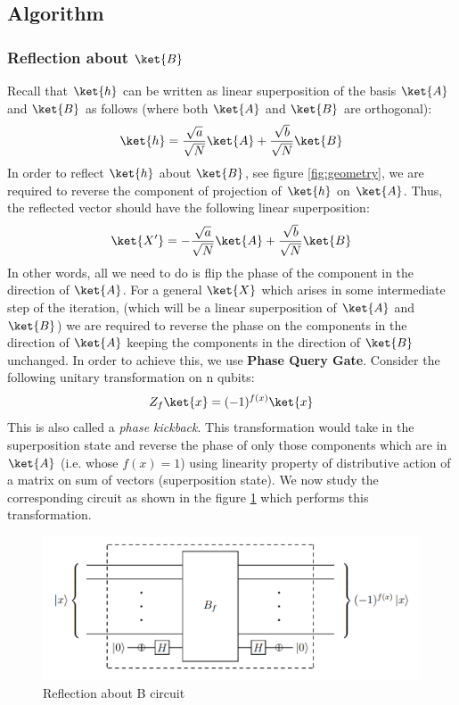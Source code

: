 \documentclass[12pt, oneside]{book}
\theoremstyle{definition}
\theoremstyle{definition}
\theoremstyle{remark}
\begin{document}
\subsection{Algorithm}
\subsubsection{Reflection about $\ket{B}$} 
Recall that $\ket{h}$ can be written as linear superposition of the basis $\ket{A}$ and $\ket{B}$ as follows (where both $\ket{A}$ and $\ket{B}$ are orthogonal):
\[
\ket{h}=\frac{\sqrt{a}}{\sqrt{N}}\ket{A}+\frac{\sqrt{b}}{\sqrt{N}}\ket{B}
\]
In order to reflect $\ket{h}$ about $\ket{B}$, see figure \ref{fig:geometry}, we are required to reverse the component of projection of $\ket{h}$ on $\ket{A}$. Thus, the reflected vector should have the following linear superposition:
\[
\ket{X'}=-\frac{\sqrt{a}}{\sqrt{N}}\ket{A}+\frac{\sqrt{b}}{\sqrt{N}}\ket{B}
\]
In other words, all we need to do is flip the phase of the component in the direction of $\ket{A}$. For a general $\ket{X}$  which arises in some intermediate step of the iteration, (which will be a linear superposition of $\ket{A}$ and $\ket{B}$) we are required to reverse the phase on the components in the direction of $\ket{A}$ keeping the components in the direction of $\ket{B}$ unchanged. In order to achieve this, we use \textbf{Phase Query Gate}. Consider the following unitary transformation on n qubits:
\[
Z_f\ket{x}=(-1)^{f(x)}\ket{x}
\]
This is also called a \textit{phase kickback}. This transformation would take in the superposition state and reverse the phase of only those components which are in $\ket{A}$ (i.e. whose $f(x)=1$) using linearity property of distributive action of a matrix on sum of vectors (superposition state). We now study the corresponding circuit as shown in the figure \ref{fig:reflect_about_b} which performs this transformation.
\begin{figure}[H]
    \centering
    \includegraphics[width=1\linewidth]{../images/reflect_about_b.png}
    \caption{Reflection about B circuit}
    \label{fig:reflect_about_b}
\end{figure}
\end{document}
